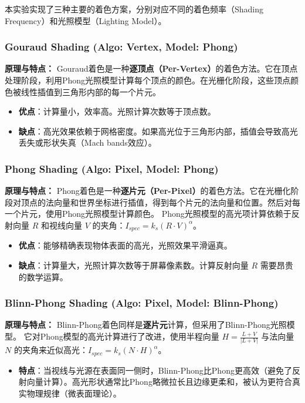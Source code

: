 \documentclass[a4paper]{article}
\begin{document}
本实验实现了三种主要的着色方案，分别对应不同的着色频率（Shading Frequency）和光照模型（Lighting Model）。

\subsubsection{Gouraud Shading (Algo: Vertex, Model: Phong)}

\textbf{原理与特点：}
Gouraud着色是一种\textbf{逐顶点（Per-Vertex）}的着色方法。它在顶点处理阶段，利用Phong光照模型计算每个顶点的颜色。在光栅化阶段，这些顶点颜色被线性插值到三角形内部的每一个片元。
\begin{itemize}
    \item \textbf{优点}：计算量小，效率高。光照计算次数等于顶点数。
    \item \textbf{缺点}：高光效果依赖于网格密度。如果高光位于三角形内部，插值会导致高光丢失或形状失真（Mach bands效应）。
\end{itemize}

\subsubsection{Phong Shading (Algo: Pixel, Model: Phong)}

\textbf{原理与特点：}
Phong着色是一种\textbf{逐片元（Per-Pixel）}的着色方法。它在光栅化阶段对顶点的法向量和世界坐标进行插值，得到每个片元的法向量和位置。然后对每一个片元，使用Phong光照模型计算颜色。
Phong光照模型的高光项计算依赖于反射向量 $R$ 和视线向量 $V$ 的夹角：$I_{spec} = k_s (R \cdot V)^\alpha$。
\begin{itemize}
    \item \textbf{优点}：能够精确表现物体表面的高光，光照效果平滑逼真。
    \item \textbf{缺点}：计算量大，光照计算次数等于屏幕像素数。计算反射向量 $R$ 需要昂贵的数学运算。
\end{itemize}

\subsubsection{Blinn-Phong Shading (Algo: Pixel, Model: Blinn-Phong)}

\textbf{原理与特点：}
Blinn-Phong着色同样是\textbf{逐片元}计算，但采用了Blinn-Phong光照模型。
它对Phong模型的高光计算进行了改进，使用半程向量 $H = \frac{L + V}{|L + V|}$ 与法向量 $N$ 的夹角来近似高光：$I_{spec} = k_s (N \cdot H)^\alpha$。
\begin{itemize}
    \item \textbf{特点}：当视线与光源在表面同一侧时，Blinn-Phong比Phong更高效（避免了反射向量计算）。高光形状通常比Phong略微拉长且边缘更柔和，被认为更符合真实物理规律（微表面理论）。
\end{itemize}
\end{document}

